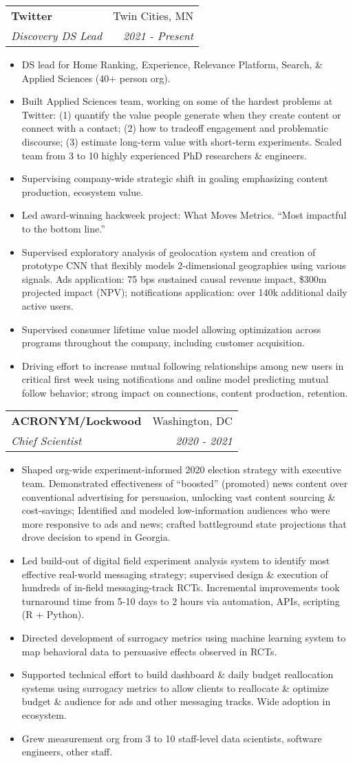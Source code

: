 \documentclass[letterpaper,11pt]{article}
\makeatletter
\newcommand{\resitem}[1]{\item #1 \vspace{-6pt}}
\newcommand{\ressubheading}[4]{\vspace{2pt}
\begin{tabular*}{7.58in}{l@{\extracolsep{\fill}}r}
		\textbf{#1} & #2 \\
		\textit{#3} & \textit{#4} \\
\end{tabular*}\vspace{-1pt}}
\makeatother
\begin{document}
\ressubheading{Twitter}{Twin Cities, MN}{Discovery DS Lead}{2021 - Present}
	\begin{itemize}
		\resitem{DS lead for Home Ranking, Experience, Relevance Platform, Search, \& Applied Sciences (40+ person org).} 
       	 	\resitem{Built Applied Sciences team, working on some of the hardest problems at Twitter: (1) quantify the value people generate when they create content or connect with a contact; (2) how to tradeoff engagement and problematic discourse; (3) estimate long-term value with short-term experiments. Scaled team from 3 to 10 highly experienced PhD researchers \& engineers.}
		\resitem{Supervising company-wide strategic shift in goaling emphasizing content production, ecosystem value.} 
		\resitem{Led award-winning hackweek project: What Moves Metrics. ``Most impactful to the bottom line.''} 
		\resitem{Supervised exploratory analysis of geolocation system and creation of prototype CNN that flexibly models 2-dimensional geographies using various signals. Ads application: 75 bps sustained causal revenue impact, \$300m projected impact (NPV); notifications application: over 140k additional daily active users.} 
		\resitem{Supervised consumer lifetime value model allowing optimization across programs throughout the company, including customer acquisition.} 
		\resitem{Driving effort to increase mutual following relationships among new users in critical first week using notifications and online model predicting mutual follow behavior; strong impact on connections, content production, retention.} 
	\end{itemize}

\ressubheading{ACRONYM/Lockwood}{Washington, DC}{Chief Scientist}{2020 - 2021}
	\begin{itemize}
       	 	\resitem{Shaped org-wide experiment-informed 2020 election strategy with executive team. Demonstrated effectiveness of ``boosted'' (promoted) news content over conventional advertising for persuasion, unlocking vast content sourcing \& cost-savings; Identified and modeled low-information audiences who were more responsive to ads and news; crafted battleground state projections that drove decision to spend in Georgia.}
		\resitem{Led build-out of digital field experiment analysis system to identify most effective real-world messaging strategy; supervised design \& execution of hundreds of in-field messaging-track RCTs. Incremental improvements took turnaround time from 5-10 days to 2 hours via automation, APIs, scripting (R + Python).}
		\resitem{Directed development of surrogacy metrics using machine learning system to map behavioral data to persuasive effects observed in RCTs.} 
		\resitem{Supported technical effort to build dashboard \& daily budget reallocation systems using surrogacy metrics to allow clients to reallocate \& optimize budget \& audience for ads and other messaging tracks. Wide adoption in ecosystem.}
		\resitem{Grew measurement org from 3 to 10 staff-level data scientists, software engineers, other staff.}
	\end{itemize}
\end{document}
